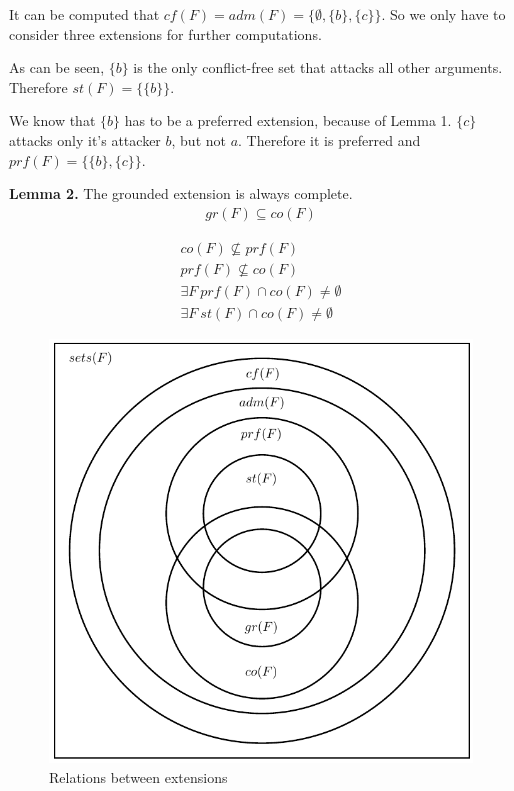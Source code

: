 \documentclass[draft,final]{vutinfth} %
\newcommand{\hl}{\par\vspace{6pt}} %
\newcommand{\dl}{\par\vspace{24pt}} %
\begin{document}
It can be computed that $cf(F)=adm(F)=\{\emptyset,\{b\},\{c\}\}$. So we only have to consider three extensions for further computations.\hl
As can be seen, $\{b\}$ is the only conflict-free set that attacks all other arguments. Therefore $st(F)=\{\{b\}\}$.\hl
We know that $\{b\}$ has to be a preferred extension, because of Lemma 1. $\{c\}$ attacks only it's attacker $b$, but not $a$. Therefore it is preferred and $prf(F)=\{\{b\},\{c\}\}$.\dl

\textbf{Lemma 2.} %
The grounded extension is always complete. %
\begin{align}
	gr(F)\subseteq co(F)
\end{align}


\begin{align}
	co(F)\not\subseteq prf(F)\\
	prf(F)\not\subseteq co(F)\\
	\exists F\ prf(F)\cap co(F) \not = \emptyset\\
	\exists F\ st(F)\cap co(F) \not = \emptyset 
\end{align}

\FloatBarrier
	\begin{figure}[!htb]
		\centering
		\includegraphics{pics/diagram.pdf}
		\caption{Relations between extensions}
	\end{figure}
\FloatBarrier
\end{document}
